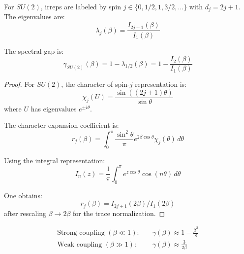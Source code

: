 \begin{theorem}
\label{thm:su2-spectrum}
For $SU(2)$, irreps are labeled by spin $j \in \{0, 1/2, 1, 3/2, \ldots\}$ with 
$d_j = 2j+1$. The eigenvalues are:
\begin{equation}
\lambda_j(\beta) = \frac{I_{2j+1}(\beta)}{I_1(\beta)}
\end{equation}

The spectral gap is:
\begin{equation}
\gamma_{SU(2)}(\beta) = 1 - \lambda_{1/2}(\beta) = 1 - \frac{I_2(\beta)}{I_1(\beta)}
\end{equation}
\end{theorem}

\begin{proof}
For $SU(2)$, the character of spin-$j$ representation is:
\begin{equation}
\chi_j(U) = \frac{\sin((2j+1)\theta)}{\sin\theta}
\end{equation}
where $U$ has eigenvalues $e^{\pm i\theta}$.

The character expansion coefficient is:
\begin{equation}
r_j(\beta) = \int_0^\pi \frac{\sin^2\theta}{\pi} e^{2\beta\cos\theta} \chi_j(\theta) \, d\theta
\end{equation}

Using the integral representation:
\begin{equation}
I_n(z) = \frac{1}{\pi} \int_0^\pi e^{z\cos\theta} \cos(n\theta) \, d\theta
\end{equation}

One obtains:
\begin{equation}
r_j(\beta) = I_{2j+1}(2\beta) / I_1(2\beta)
\end{equation}
after rescaling $\beta \to 2\beta$ for the trace normalization.
\end{proof}

\begin{corollary}
\label{cor:su2-gap}
\begin{align}
\text{Strong coupling } (\beta \ll 1): \quad & \gamma(\beta) \approx 1 - \frac{\beta^2}{8} \\
\text{Weak coupling } (\beta \gg 1): \quad & \gamma(\beta) \approx \frac{3}{2\beta}
\end{align}
\end{corollary}

